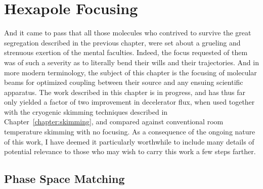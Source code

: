 \ifx\justbeingincluded\undefined


\fi

\chapter{Hexapole Focusing}
\label{chapter:hex}

And it came to pass that all those molecules who contrived to survive the great segregation described in the previous chapter, were set about a grueling and strenuous exertion of the mental faculties. Indeed, the focus requested of them was of such a severity as to literally bend their wills and their trajectories. 
And in more modern terminology, the subject of this chapter is the focusing of molecular beams for optimized coupling between their source and any ensuing scientific apparatus.
The work described in this chapter is in progress, and has thus far only yielded a factor of two improvement in decelerator flux, when used together with the cryogenic skimming techniques described in Chapter~\ref{chapter:skimming}, and compared against conventional room temperature skimming with no focusing.
As a consequence of the ongoing nature of this work, I have deemed it particularly worthwhile to include many details of potential relevance to those who may wish to carry this work a few steps farther.

\section{Phase Space Matching}

